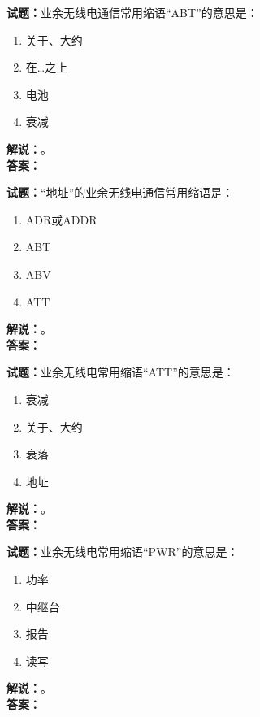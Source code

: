 \documentclass{ctexbook}
\begin{document}
\vspace{\baselineskip}

\noindent\textbf{试题：}业余无线电通信常用缩语“ABT”的意思是：
\begin{enumerate}[leftmargin=3em]
  \item 关于、大约
  \item 在…之上
  \item 电池
  \item 衰减
\end{enumerate}
\noindent\textbf{解说：}\textbf{}。\\\noindent\textbf{答案：}

\vspace{\baselineskip}

\noindent\textbf{试题：}“地址”的业余无线电通信常用缩语是：
\begin{enumerate}[leftmargin=3em]
  \item ADR或ADDR
  \item ABT
  \item ABV
  \item ATT
\end{enumerate}
\noindent\textbf{解说：}\textbf{}。\\\noindent\textbf{答案：}

\vspace{\baselineskip}

\noindent\textbf{试题：}业余无线电常用缩语“ATT”的意思是：
\begin{enumerate}[leftmargin=3em]
  \item 衰减
  \item 关于、大约
  \item 衰落
  \item 地址
\end{enumerate}
\noindent\textbf{解说：}\textbf{}。\\\noindent\textbf{答案：}

\vspace{\baselineskip}

\noindent\textbf{试题：}业余无线电常用缩语“PWR”的意思是：
\begin{enumerate}[leftmargin=3em]
  \item 功率
  \item 中继台
  \item 报告
  \item 读写
\end{enumerate}
\noindent\textbf{解说：}\textbf{}。\\\noindent\textbf{答案：}
\end{document}
